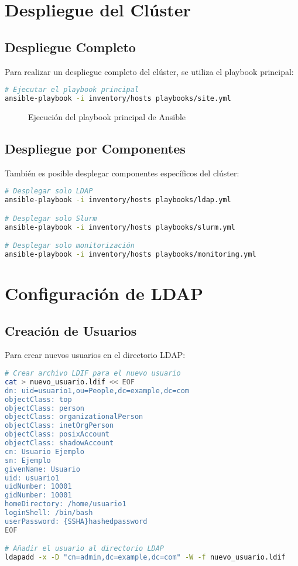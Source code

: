 \documentclass[12pt,a4paper]{report}
\begin{document}
\section{Despliegue del Clúster}

\subsection{Despliegue Completo}

Para realizar un despliegue completo del clúster, se utiliza el playbook principal:

\begin{lstlisting}[language=bash]
# Ejecutar el playbook principal
ansible-playbook -i inventory/hosts playbooks/site.yml
\end{lstlisting}

\begin{figure}[H]
\centering
\caption{Ejecución del playbook principal de Ansible}
\label{fig:ansible_deployment}
\end{figure}

\subsection{Despliegue por Componentes}

También es posible desplegar componentes específicos del clúster:

\begin{lstlisting}[language=bash]
# Desplegar solo LDAP
ansible-playbook -i inventory/hosts playbooks/ldap.yml

# Desplegar solo Slurm
ansible-playbook -i inventory/hosts playbooks/slurm.yml

# Desplegar solo monitorización
ansible-playbook -i inventory/hosts playbooks/monitoring.yml
\end{lstlisting}

\section{Configuración de LDAP}

\subsection{Creación de Usuarios}

Para crear nuevos usuarios en el directorio LDAP:

\begin{lstlisting}[language=bash]
# Crear archivo LDIF para el nuevo usuario
cat > nuevo_usuario.ldif << EOF
dn: uid=usuario1,ou=People,dc=example,dc=com
objectClass: top
objectClass: person
objectClass: organizationalPerson
objectClass: inetOrgPerson
objectClass: posixAccount
objectClass: shadowAccount
cn: Usuario Ejemplo
sn: Ejemplo
givenName: Usuario
uid: usuario1
uidNumber: 10001
gidNumber: 10001
homeDirectory: /home/usuario1
loginShell: /bin/bash
userPassword: {SSHA}hashedpassword
EOF

# Añadir el usuario al directorio LDAP
ldapadd -x -D "cn=admin,dc=example,dc=com" -W -f nuevo_usuario.ldif
\end{lstlisting}
\end{document}

